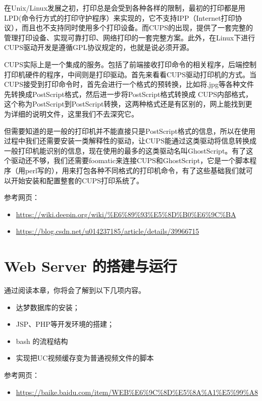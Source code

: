 \documentclass[doctor,openright,twoside]{sjtuthesis}
\providecommand{\tightlist}{%
    \setlength{\itemsep}{0pt}\setlength{\parskip}{0pt}}
\theoremstyle{plain}
\theoremstyle{definition}
\theoremstyle{remark}
\theoremstyle{ocrenumbox}
\theoremstyle{plain}
\begin{document}
在Unix/Linux发展之初，打印总是会受到各种各样的限制，最初的打印都是用LPD(命令行方式的打印守护程序）来实现的，它不支持IPP（Internet打印协议），而且也不支持同时使用多个打印设备。而CUPS的出现，提供了一套完整的管理打印设备、实现可靠打印、网络打印的一套完整方案。此外，在Linux下进行CUPS驱动开发是遵循GPL协议规定的，也就是说必须开源。

CUPS实际上是一个集成的服务。包括了前端接收打印命令的相关程序，后端控制打印机硬件的程序，中间则是打印驱动。首先来看看CUPS驱动打印机的方式。当CUPS接受到打印命令时，首先会进行一个格式的预转换，比如将.jpg等各种文件先转换成PostScript格式，然后进一步将PostScript格式转换成 CUPS内部格式，这个称为PostScript到PostScript转换，这两种格式还是有区别的，网上能找到更为详细的说明文件，这里我们不去深究它。

但需要知道的是一般的打印机并不能直接只是PostScript格式的信息，所以在使用过程中我们还需要安装一类解释性的驱动，让CUPS能通过这类驱动将信息转换成一般打印机能识别的信息，现在使用的最多的这类驱动名叫GhostScript。有了这个驱动还不够，我们还需要foomatic来连接CUPS和GhostScript，它是一个脚本程序（用perl写的），用来打包各种不同格式的打印机命令，有了这些基础我们就可以开始安装和配置整套的CUPS打印系统了。

参考网页：

\begin{itemize}
\tightlist
\item
  \url{https://wiki.deepin.org/wiki/\%E6\%89\%93\%E5\%8D\%B0\%E6\%9C\%BA}
\item
  \url{https://blog.csdn.net/u014237185/article/details/39966715}
\end{itemize}

\hypertarget{web-server-}{%
\chapter{Web Server 的搭建与运行}\label{web-server-}}

通过阅读本章，你将会了解到以下几项内容。

\begin{itemize}
\tightlist
\item
  达梦数据库的安装；
\item
  JSP、PHP等开发环境的搭建；
\item
  bash 的流程结构
\item
  实现把UC视频缓存变为普通视频文件的脚本
\end{itemize}

参考网页：

\begin{itemize}
\tightlist
\item
  \url{https://baike.baidu.com/item/WEB\%E6\%9C\%8D\%E5\%8A\%A1\%E5\%99\%A8}
\end{itemize}
\end{document}
